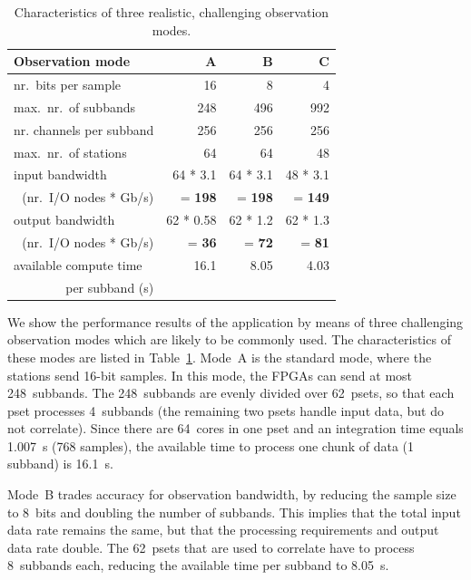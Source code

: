 \documentclass{sig-alternate}
\begin{document}
\begin{table}[ht]
\begin{center}
\begin{tabular}{|l|rrr|}
\hline
Observation mode	 & \textsf{A}	& \textsf{B}	& \textsf{C}	\\
\hline
nr.\ bits per sample	 & 16		& 8		& 4	\\
max.\ nr.\ of subbands	 & 248		& 496		& 992	\\
nr. channels per subband & 256		& 256		& 256	\\
max.\ nr.\ of stations	 & 64		& 64		& 48	\\
\hline
input bandwidth & 64 * 3.1  & 64 * 3.1 & 48 * 3.1 \\
\multicolumn{1}{|r|}{(nr.\ I/O nodes * Gb/s)} & = \textbf{198} & = \textbf{198} & = \textbf{149} \\
output bandwidth & 62 * 0.58 & 62 * 1.2 & 62 * 1.3 \\
\multicolumn{1}{|r|}{(nr.\ I/O nodes * Gb/s)}  & = \textbf{36} & = \textbf{72} & = \textbf{81} \\
\hline
available compute time	 & 16.1	     & 8.05     & 4.03     \\
\multicolumn{1}{|r|}{per subband (s)}	 & & & \\
\hline
\end{tabular}
\end{center}
\caption{Characteristics of three realistic, challenging observation modes.}
\label{tab:observation-characteristics}
\end{table}

We show the performance results of the application by means of three
challenging observation modes which are likely to be commonly used.
The characteristics of these modes are listed in
Table~\ref{tab:observation-characteristics}.
Mode~\textsf{A} is the standard mode, where the stations send 16-bit samples.
In this mode, the FPGAs can send at most 248~subbands.
The 248~subbands are evenly divided over 62~psets, so that each pset processes
4~subbands (the remaining two psets handle input data, but do not correlate).
Since there are 64~cores in one pset and an integration time equals 1.007~s (768 samples),
the available time to process one chunk of data (1 subband) is 16.1~s.

Mode~\textsf{B} trades accuracy for observation bandwidth, by reducing the
sample size to 8~bits and doubling the number of subbands.
This implies that the total input data rate remains the same, but that the
processing requirements and output data rate double.
The 62~psets that are used to correlate have to process 8~subbands each,
reducing the available time per subband to 8.05~s.
\end{document}
